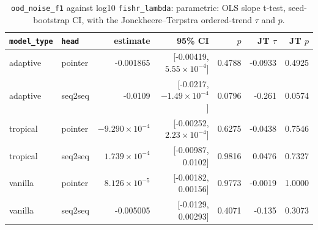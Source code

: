 \documentclass[10pt]{article}
\begin{document}
{\small
\begin{longtable}{llrrrrr}
\caption{\texttt{ood\_noise\_f1} against log10 \texttt{fishr\_lambda}: parametric: OLS slope t-test, seed-bootstrap CI, with the Jonckheere--Terpstra ordered-trend $\tau$ and $p$.}\label{tab:trend-ood_noise_f1}\\
\toprule
\texttt{model\_type} & \texttt{head} & estimate & 95\% CI & $p$ & JT $\tau$ & JT $p$\\
\midrule
\endhead
adaptive & pointer & -0.001865 & [-0.00419, $5.55\times10^{-4}$] & 0.4788 & -0.0933 & 0.4925\\
adaptive & seq2seq & -0.0109 & [-0.0217, $-1.49\times10^{-4}$] & 0.0796 & -0.261 & 0.0574\\
tropical & pointer & $-9.290\times10^{-4}$ & [-0.00252, $2.23\times10^{-4}$] & 0.6275 & -0.0438 & 0.7546\\
tropical & seq2seq & $1.739\times10^{-4}$ & [-0.00987, 0.0102] & 0.9816 & 0.0476 & 0.7327\\
vanilla & pointer & $8.126\times10^{-5}$ & [-0.00182, 0.00156] & 0.9773 & -0.0019 & 1.0000\\
vanilla & seq2seq & -0.005005 & [-0.0129, 0.00293] & 0.4071 & -0.135 & 0.3073\\
\bottomrule
\end{longtable}
}
\end{document}

